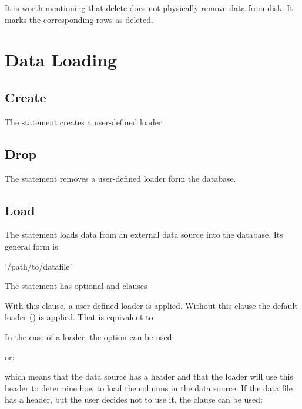 It is worth mentioning that delete
does not physically remove data from disk.
It marks the corresponding rows as deleted.

\section{Data Loading}
\subsection{Create}
The  statement creates a user-defined loader.


\subsection{Drop}
The  statement removes a user-defined loader
form the database.


\subsection{Load}
The  statement loads data from an external
data source into the database.
Its general form is

 '/path/to/datafile'  

The  statement has optional  and  clauses

 

With this clause, a user-defined loader is applied.
Without this clause the default loader ()
is applied. That is equivalent to

 

In the case of a  loader,
the  option can be used:


or:


which means that the data source has a header and that the loader
will use this header to determine how to load the columns in the data source.
If the data file has a header, but the user decides not to use it,
the  clause can be used:


